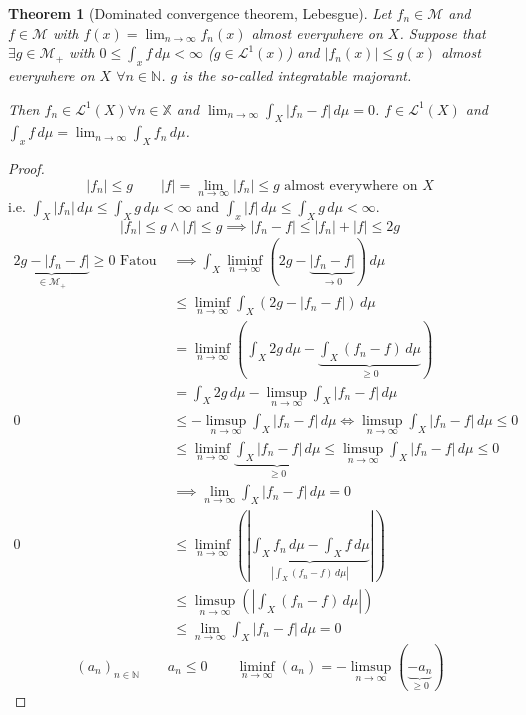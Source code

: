 \documentclass{article}
\newtheorem{theorem}{Theorem}  \numberwithin{theorem}{section}
\newcommand{\card}[1]{\left|#1\right|}
\begin{document}
\begin{theorem}[Dominated convergence theorem, Lebesgue] %
  Let $f_n \in \mathcal M$ and $f \in \mathcal M$ with $f(x) = \lim_{n\to\infty} f_n(x)$ almost everywhere on $X$.
  Suppose that $\exists g \in \mathcal M_+$ with $0 \leq \int_x f \, d\mu < \infty$ ($g \in \mathcal L^1(x)$) and $\card{f_n(x)} \leq g(x)$ almost everywhere on $X$ $\forall n \in \mathbb N$.
  $g$ is the so-called \emph{integratable majorant}.

  Then $f_n \in \mathcal L^1(X) \forall n \in \mathbb X$ and $\lim_{n\to\infty} \int_X \card{f_n - f} \, d\mu = 0$. $f \in \mathcal L^1(X)$ and $\int_x f \, d\mu = \lim_{n\to\infty} \int_X f_n \, d\mu$.
\end{theorem}
\begin{proof}
  \[ \card{f_n} \leq g \qquad \card{f} = \lim_{n\to\infty} \card{f_n} \leq g \text{ almost everywhere on } X \]
  i.e. $\int_X \card{f_n} \, d\mu \leq \int_X g \, d\mu < \infty$ and $\int_x \card{f} \, d\mu \leq \int_X g \, d\mu < \infty$.
  \[ \card{f_n} \leq g \land \card{f} \leq g \implies \card{f_n - f} \leq \card{f_n} + \card{f} \leq 2g \]
  \begin{align*}
    \underbrace{2g - \card{f_n - f}}_{\in \mathcal M_+} \geq 0 \text{ Fatou }
    &\implies \int_X \liminf_{n\to\infty} (2g - \underbrace{\card{f_n - f}}_{\to 0}) \, d\mu \\
    &\leq \liminf_{n\to\infty} \int_X (2g - \card{f_n - f}) \, d\mu \\
    &= \liminf_{n\to\infty} (\int_X 2g \, d\mu - \underbrace{\int_X (f_n - f) \, d\mu}_{\geq 0}) \\
    &= \int_X 2g \, d\mu - \limsup_{n\to\infty} \int_X \card{f_n - f} \, d\mu \\
  0 &\leq -\limsup_{n\to\infty} \int_X \card{f_n - f} \, d\mu \iff \limsup_{n\to\infty} \int_X \card{f_n - f} \, d\mu \leq 0 \\
    &\leq \liminf_{n\to\infty} \underbrace{\int_X \card{f_n - f} \, d\mu}_{\geq 0} \leq \limsup_{n\to\infty} \int_X \card{f_n - f} \, d\mu \leq  0 \\
    &\implies \lim_{n\to\infty} \int_X \card{f_n - f} \, d\mu = 0 \\
  0 &\leq \liminf_{n\to\infty} \left(\card{\underbrace{\int_X f_n \, d\mu - \int_X f \, d\mu}_{\card{\int_X (f_n - f) \, d\mu}}}\right) \\
    &\leq \limsup_{n\to\infty} \left(\card{\int_X (f_n - f) \, d\mu}\right) \\
    &\leq \lim_{n\to\infty} \int_X \card{f_n - f} \, d\mu = 0
  \end{align*}
  \[ (a_n)_{n\in\mathbb N} \qquad a_n \leq 0 \qquad \liminf_{n\to\infty} (a_n) = -\limsup_{n\to\infty} (\underbrace{-a_n}_{\geq 0}) \]
\end{proof}
\end{document}
